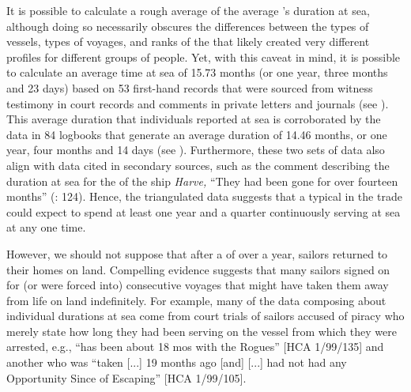It is possible to calculate a rough average of the average ’s duration at sea, although doing so necessarily obscures the differences between the types of vessels, types of voyages, and ranks of the  that likely created very different profiles for different groups of people. Yet, with this caveat in mind, it is possible to calculate an average time at sea of 15.73 months (or one year, three months and 23 days) based on 53 first-hand records that were sourced from witness testimony in court records and comments in private letters and journals (see ). This average duration that individuals reported at sea is corroborated by the data in 84 logbooks that generate an average  duration of 14.46 months, or one year, four months and 14 days (see ). Furthermore, these two sets of data also align with data cited in secondary sources, such as the comment describing the duration at sea for the  of the  ship \textit{Harve,} “They had been gone for over fourteen months” (\citealt{Bicheno2012}: 124). Hence, the triangulated data suggests that a typical  in the  trade could expect to spend at least one year and a quarter continuously serving at sea at any one time. 

However, we should not suppose that after a  of over a year, sailors returned to their homes on land. Compelling evidence suggests that many sailors signed on for (or were forced into) consecutive voyages that might have taken them away from life on land indefinitely. For example, many of the data composing  about individual durations at sea come from court trials of sailors accused of piracy who merely state how long they had been serving on the vessel from which they were arrested, e.g., “has been about 18 mos with the Rogues” [HCA 1/99/135] and another  who was “taken [...] 19 months ago [and] [...] had not had any Opportunity Since of Escaping” [HCA 1/99/105].



